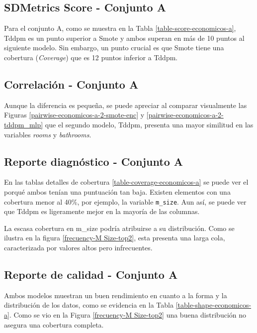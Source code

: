 \newpage
\subsection{SDMetrics Score - Conjunto A}
\label{ds-conjunto-a}
Para el conjunto A, como se muestra en la Tabla \ref{table-score-economicos-a}, Tddpm es un punto superior a Smote y ambos superan en más de 10 puntos al siguiente modelo. Sin embargo, un punto crucial es que Smote tiene una cobertura (\emph{Coverage}) que es 12 puntos inferior a Tddpm.



\newpage
\subsection{Correlación - Conjunto A}
Aunque la diferencia es pequeña, se puede apreciar al comparar visualmente las Figuras \ref{pairwise-economicos-a-2-smote-enc} y \ref{pairwise-economicos-a-2-tddpm_mlp} que el segundo modelo, Tddpm, presenta una mayor similitud en las variables \emph{rooms} y \emph{bathrooms}.




\newpage
\subsection{Reporte diagnóstico - Conjunto A}
En las tablas detalles de cobertura \ref{table-coverage-economicos-a} se puede ver el porqué ambos tenían una puntuación tan baja. Existen elementos con una cobertura menor al 40\%, por ejemplo, la variable \texttt{m\_size}. Aun así, se puede ver que Tddpm es ligeramente mejor en la mayoría de las columnas.

La escasa cobertura en m\_size podría atribuirse a su distribución. Como se ilustra en la figura \ref{frecuency-M Size-top2}, esta presenta una larga cola, caracterizada por valores altos pero infrecuentes.

\newpage
\subsection{Reporte de calidad - Conjunto A}
Ambos modelos muestran un buen rendimiento en cuanto a la forma y la distribución de los datos, como se evidencia en la Tabla \ref{table-shape-economicos-a}. Como se vio en la Figura  \ref{frecuency-M Size-top2} una buena distribución no asegura una cobertura completa.




